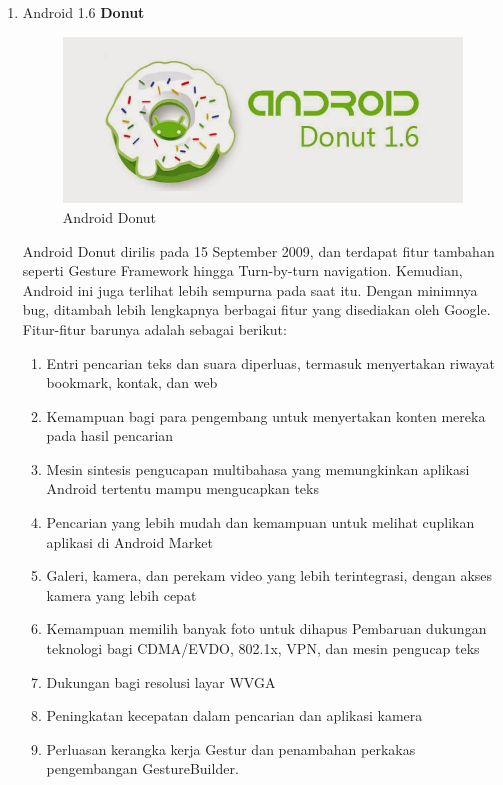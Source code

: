 \begin{enumerate}
\item Android 1.6 \textbf{Donut}\\
\begin{figure}[!htbp]
    \centering
    \includegraphics[scale=0.5]{pictures/android_donut.jpg}
    \caption{Android Donut}
    \label{}
\end{figure}

Android Donut dirilis pada 15 September 2009, dan terdapat fitur tambahan seperti Gesture Framework hingga Turn-by-turn navigation. Kemudian, Android ini juga terlihat lebih sempurna pada saat itu. Dengan minimnya bug, ditambah lebih lengkapnya berbagai fitur yang disediakan oleh Google. Fitur-fitur barunya adalah sebagai berikut:
\begin{enumerate}
    \item Entri pencarian teks dan suara diperluas, termasuk menyertakan riwayat bookmark, kontak, dan web
    \item Kemampuan bagi para pengembang untuk menyertakan konten mereka pada hasil pencarian
    \item Mesin sintesis pengucapan multibahasa yang memungkinkan aplikasi Android tertentu mampu mengucapkan teks
    \item Pencarian yang lebih mudah dan kemampuan untuk melihat cuplikan aplikasi di Android Market
    \item Galeri, kamera, dan perekam video yang lebih terintegrasi, dengan akses kamera yang lebih cepat
    \item Kemampuan memilih banyak foto untuk dihapus
    Pembaruan dukungan teknologi bagi CDMA/EVDO, 802.1x, VPN, dan mesin pengucap teks
    \item Dukungan bagi resolusi layar WVGA
    \item Peningkatan kecepatan dalam pencarian dan aplikasi kamera
    \item Perluasan kerangka kerja Gestur dan penambahan perkakas pengembangan GestureBuilder.
\end{enumerate}


\end{enumerate}
